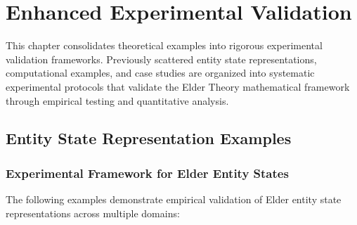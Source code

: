 \chapter{Enhanced Experimental Validation}

\begin{tcolorbox}[colback=green!5!white,colframe=green!75!black,title=\textit{Chapter Summary}]
This chapter consolidates theoretical examples into rigorous experimental validation frameworks. Previously scattered entity state representations, computational examples, and case studies are organized into systematic experimental protocols that validate the Elder Theory mathematical framework through empirical testing and quantitative analysis.
\end{tcolorbox}

\section{Entity State Representation Examples}

\subsection{Experimental Framework for Elder Entity States}

The following examples demonstrate empirical validation of Elder entity state representations across multiple domains:

